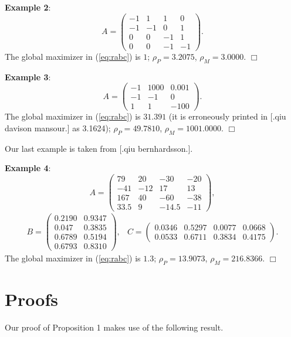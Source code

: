 \smallskip
\noindent
{\bf Example 2}:
\[ A=
\left( \begin{array}{cccc}
-1 & 1 & 1 & 0 \\
-1 & -1 & 0 & 1 \\
0 & 0 & -1 & 1 \\
0 & 0 & -1 & -1 
\end{array}  \right).
\]
The global maximizer in (\ref{eq:rabc}) is $1$;
$\rho_P=3.2075$,
$\rho_M=3.0000$.
\hfill $\Box$

\smallskip
\noindent
{\bf Example 3}:
\[ A=
\left(  \begin{array}{ccc}
-1 & 1000 & 0.001 \\
-1 & -1 & 0  \\
1 & 1 & -100
\end{array}  \right).
\]
The global maximizer in (\ref{eq:rabc}) is $31.391$ 
(it is erroneously printed in [.qiu davison mansour.] as 3.1624); 
$\rho_P=49.7810$,
$\rho_M=1001.0000$.
\hfill $\Box$

\bigskip
\noindent
Our last example is taken from [.qiu bernhardsson.].

\smallskip
\noindent
{\bf Example 4}:
\[ A=
\left(  \begin{array}{cccc}
79 & 20 & -30 & -20  \\
-41 & -12 & 17 & 13  \\
167 & 40 & -60 & -38 \\
33.5 & 9 & -14.5 & -11 
\end{array}  \right),
\]
\[ 
\begin{array}{cc}
B=\left( \begin{array}{cc}
0.2190 & 0.9347  \\
0.047  & 0.3835  \\
0.6789 & 0.5194  \\
0.6793 & 0.8310  
\end{array}   \right),
&
C=\left( \begin{array}{cccc}
0.0346 & 0.5297 & 0.0077 & 0.0668  \\
0.0533 & 0.6711 & 0.3834 & 0.4175 
\end{array}  \right).
\end{array}
\]
The global maximizer in (\ref{eq:rabc}) is $1.3$; 
$\rho_P=13.9073$, 
$\rho_M=216.8366$.
\hfill $\Box$

\section{Proofs}

Our proof of Proposition 1 makes use of the following result.

